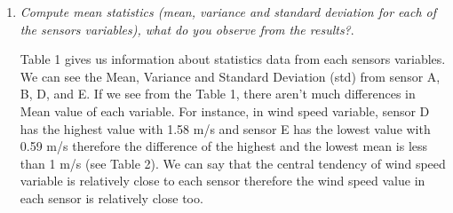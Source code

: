 \documentclass[a4paper,12pt]{article} %
\begin{document}
\begin{enumerate}

\item {\it Compute mean statistics (mean, variance and standard deviation for each of the sensors variables), what do you observe from the results?}. %

Table 1 gives us information about statistics data from each sensors variables. We can see the Mean, Variance and Standard Deviation (std) from sensor A, B, D, and E. If we see from the Table 1, there aren't much differences in Mean value of each variable. For instance, in wind speed variable, sensor D has the highest value with 1.58 m/s and sensor E has the lowest value with 0.59 m/s therefore the difference of the highest and the lowest mean is less than 1 m/s (see Table 2). We can say that the central tendency of wind speed variable is relatively close to each sensor therefore the wind speed value in each sensor is relatively close too.


\end{enumerate}
\end{document}
